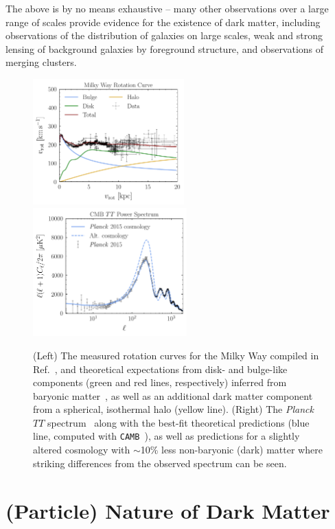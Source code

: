 The above is by no means exhaustive -- many other observations over a large range of scales provide evidence for the existence of dark matter, including observations of the distribution of galaxies on large scales, weak and strong lensing of background galaxies by foreground structure, and observations of merging clusters.

\begin{figure}[htbp] 
\hspace{-0.9 cm} 
\includegraphics[width=0.5185\textwidth]{ch-intro/rotcurves.pdf}
 \includegraphics[width=0.528\textwidth]{ch-intro/cells.pdf}  
\caption{(Left) The measured rotation curves for the Milky Way compiled in Ref.~\cite{2009PASJ...61..227S}, and theoretical expectations from disk- and bulge-like components (green and red lines, respectively) inferred from baryonic matter~\cite{2009PASJ...61..227S}, as well as an additional dark matter component from a spherical, isothermal halo (yellow line). (Right) The \emph{Planck} $TT$ spectrum~\cite{Ade:2015xua} along with the best-fit theoretical predictions (blue line, computed with \texttt{CAMB}~\cite{Lewis:1999bs}), as well as predictions for a slightly altered cosmology with $\sim$10\% less non-baryonic (dark) matter where striking differences from the observed spectrum can be seen.}  
\label{fig:evidence}
\end{figure}


\section{(Particle) Nature of Dark Matter}
\label{sec:particledm}

